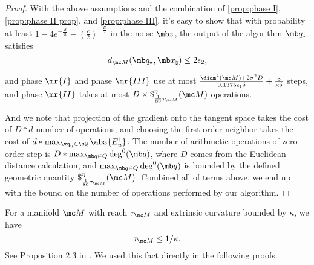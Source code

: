\begin{proof}
With the above assumptions and the combination of \cref{prop:phase I}, \cref{prop:phase II prop}, and \cref{prop:phase III}, it's easy to show that with probability at least $ 1-4e^{-\frac{d}{16}} - \left(\frac{e}{2}\right)^{-\frac{D}{2}}$ in the noise $\mb z$, the output of the algorithm $\mb q_\star$ satisfies
\begin{equation}
    d_{\mc M}(\mb q_\star, \mb x_\natural) \leq 2\epsilon_2,
\end{equation}

and phase $\mr{I}$ and phase $\mr{III}$ use at most $ \frac{\diam^2(\mc M) + 2 \sigma^2 D} {0.1375 \epsilon_1 \delta} + \frac{8}{\kappa\delta}$ steps, and phase $\mr{II}$ takes at most $ D \times \$^{\eta}_{\frac{1}{80} \tau_{\mc M}} (\mc M)$ operations.

And we note that projection of the gradient onto the tangent space takes the cost of $D*d$ number of operations, and choosing the first-order neighbor takes the cost of $d * \max_{\vq_u \in \sQ}\abs{E_{u}^1}$. The number of arithmetic operations  of zero-order step is $D*\max_{\mb q\in Q} \deg^0(\mb q)$, where $D$ comes from the Euclidean distance calculation, and $\max_{\mb q\in Q} \deg^0(\mb q)$ is bounded by the defined geometric quantity $\$^{\eta}_{\frac{1}{80} \tau_{\mc M}} (\mc M)$. Combined all of terms above, we end up with the bound on the number of operations performed by our algorithm.
\end{proof}



\begin{fact} 
    For a manifold $\mc M$ with reach $\tau_{\mc M}$ and extrinsic curvature bounded by $\kappa$, we have
    \begin{equation}
        \tau_{\mc M} \leq 1/\kappa.
    \end{equation}
See Proposition 2.3 in \cite{aamari2019estimating}. We used this fact directly in the following proofs.
\end{fact}




